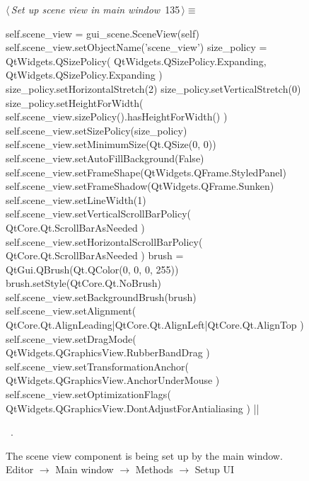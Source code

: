 \documentclass[%
    a4paper,    %
    justified,  %
    nobib,      %
    openany     %
]{tufte-book}
\makeatletter
\renewcommand{\label}[1]{\@tufte@label{##1}}%
\makeatother
\begin{document}
\begin{figure}[!htbp]
\begin{flushleft} \small
\begin{minipage}{\linewidth}\label{scrap82}\raggedright\small
{} $\langle\,${\itshape Set up scene view in main window}\nobreak\ {\footnotesize {135}}$\,\rangle\equiv$
\vspace{-1ex}
\begin{pythoncode}
self.scene_view = gui_scene.SceneView(self)
self.scene_view.setObjectName('scene_view')
size_policy = QtWidgets.QSizePolicy(
    QtWidgets.QSizePolicy.Expanding,
    QtWidgets.QSizePolicy.Expanding
)
size_policy.setHorizontalStretch(2)
size_policy.setVerticalStretch(0)
size_policy.setHeightForWidth(
    self.scene_view.sizePolicy().hasHeightForWidth()
)
self.scene_view.setSizePolicy(size_policy)
self.scene_view.setMinimumSize(Qt.QSize(0, 0))
self.scene_view.setAutoFillBackground(False)
self.scene_view.setFrameShape(QtWidgets.QFrame.StyledPanel)
self.scene_view.setFrameShadow(QtWidgets.QFrame.Sunken)
self.scene_view.setLineWidth(1)
self.scene_view.setVerticalScrollBarPolicy(
    QtCore.Qt.ScrollBarAsNeeded
)
self.scene_view.setHorizontalScrollBarPolicy(
    QtCore.Qt.ScrollBarAsNeeded
)
brush = QtGui.QBrush(Qt.QColor(0, 0, 0, 255))
brush.setStyle(QtCore.Qt.NoBrush)
self.scene_view.setBackgroundBrush(brush)
self.scene_view.setAlignment(
    QtCore.Qt.AlignLeading|QtCore.Qt.AlignLeft|QtCore.Qt.AlignTop
)
self.scene_view.setDragMode(
    QtWidgets.QGraphicsView.RubberBandDrag
)
self.scene_view.setTransformationAnchor(
    QtWidgets.QGraphicsView.AnchorUnderMouse
)
self.scene_view.setOptimizationFlags(
    QtWidgets.QGraphicsView.DontAdjustForAntialiasing
)
|\NWsep|
\end{pythoncode}
\vspace{1.5ex}
\footnotesize
\begin{list}{}{\setlength{\itemsep}{-\parsep}\setlength{\itemindent}{-\leftmargin}}
\item \NWtxtMacroRefIn\ .

\item{}
\end{list}
\end{minipage}\vspace{4ex}
\end{flushleft}
\caption{The scene view component is being set up by the main window.
  \newline{}\newline{}Editor $\rightarrow$ Main window $\rightarrow$
  Methods $\rightarrow$ Setup UI}
\end{figure}
\end{document}

